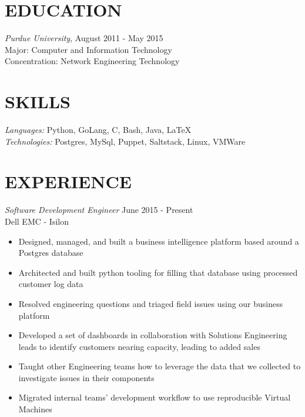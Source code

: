 \documentclass[line,margin]{res}
\begin{document}
  \name{\textcolor{TealBlue}{Ethan Madden}}
  \address{ethan@madden.ninja - (812) 250-1419}
  \address{2049 NW 60th St, Seattle WA 98107}

\begin{resume}
  \section{\textcolor{TealBlue}{EDUCATION}} 
    {\sl Purdue University}, \hfill August 2011 - May 2015 \\
      Major: Computer and Information Technology \\
      Concentration: Network Engineering Technology

  \section{\textcolor{TealBlue}{SKILLS}} 
    {\sl Languages:}  Python, GoLang, C, Bash, Java, \LaTeX \\
    {\sl Technologies:} Postgres, MySql, Puppet, Saltstack, Linux, VMWare

  \section{\textcolor{TealBlue}{EXPERIENCE}} 
    {\sl Software Development Engineer} \hfill June 2015 - Present \\
      Dell EMC - Isilon
      \begin{itemize}  \itemsep -2pt
        \item Designed, managed, and built a business intelligence platform based around a Postgres database
        \item Architected and built python tooling for filling that database using processed customer log data
        \item Resolved engineering questions and triaged field issues using our business platform
        \item Developed a set of dashboards in collaboration with Solutions Engineering leads to identify customers nearing capacity, leading to added sales
        \item Taught other Engineering teams how to leverage the data that we collected to investigate issues in their components
        \item Migrated internal teams' development workflow to use reproducible Virtual Machines
      \end{itemize}


\end{resume}
\end{document}
